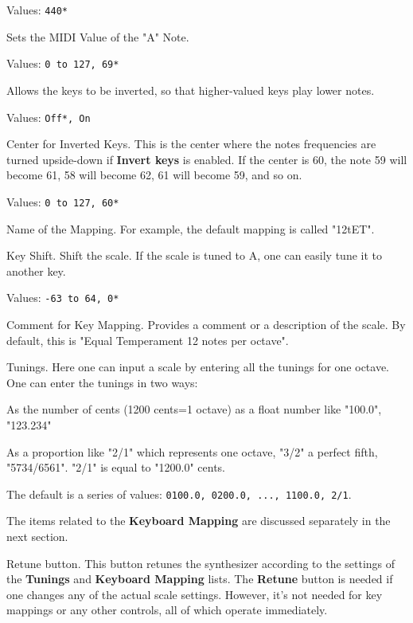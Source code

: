    Values: \texttt{440*}

   Sets the MIDI Value of the "A" Note.

   Values: \texttt{0 to 127, 69*}

   Allows the keys to be inverted, so that higher-valued keys play lower
   notes.

   Values: \texttt{Off*, On}

   Center for Inverted Keys.
   This is the center where the notes frequencies are turned upside-down if
   \textbf{Invert keys} is enabled.
   If the center is 60, the note 59 will become 61, 58 will become 62, 61
   will become 59, and so on.

   Values: \texttt{0 to 127, 60*}

   Name of the Mapping.
   For example, the default mapping is called "12tET".

   Key Shift.
   Shift the scale. If the scale is tuned to A, one can easily tune it to
   another key.

   Values: \texttt{-63 to 64, 0*}

   Comment for Key Mapping.
   Provides a comment or a description of the scale.
   By default, this is "Equal Temperament 12 notes per octave".

   Tunings.
   Here one can input a scale by entering all the tunings for one octave.
One can enter the tunings in two ways:

   \begin{enumber}
      \item As the number of cents (1200 cents=1 octave) as a float number
         like "100.0", "123.234"
      \item As a proportion like "2/1" which represents one octave, "3/2" a
         perfect fifth, "5734/6561".  "2/1" is equal to "1200.0" cents.
   \end{enumber}

   The default is a series of values:
   \texttt{0100.0, 0200.0, ..., 1100.0, 2/1}.

   The items related to the \textbf{Keyboard Mapping} are discussed
   separately in the next section.

   Retune button.
   This button retunes the synthesizer according to the settings of
   the \textbf{Tunings} and \textbf{Keyboard Mapping} lists.
   The \textbf{Retune} button is needed if one
   changes any of the actual scale settings. However, it's not needed for key
   mappings or any other controls, all of which operate immediately.

